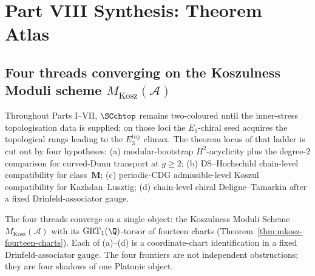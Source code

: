 
\chapter*{Part VIII Synthesis: Theorem Atlas}
\label{chap:part-viii-synthesis}

\section{Four threads converging on the Koszulness Moduli scheme
$M_{\mathrm{Kosz}}(\mathcal{A})$}
\label{sec:part-viii-overview}

Throughout Parts I--VII, $\SCchtop$ remains two-coloured until the
inner-stress topologisation data is supplied; on those loci the
$E_{1}$-chiral seed acquires the topological rungs leading to the
$E_{3}^{\mathrm{top}}$ climax. The theorem locus of that ladder is cut out by
four hypotheses:
(a) modular-bootstrap \(H^{2}\)-acyclicity plus the degree-\(2\)
comparison for curved-Dunn transport at \(g\ge2\);
(b) DS--Hochschild chain-level compatibility for class~$\mathbf{M}$;
(c) periodic-CDG admissible-level Koszul compatibility for
Kazhdan--Lusztig; (d) chain-level chiral Deligne--Tamarkin after a
fixed Drinfeld-associator gauge.

The four threads converge on a single object: the Koszulness Moduli
Scheme $M_{\mathrm{Kosz}}(\mathcal A)$ with its $\mathrm{GRT}_{1}(\Q)$-torsor
of fourteen charts (Theorem~\ref{thm:mkosz-fourteen-charts}). Each of
(a)--(d) is a coordinate-chart identification in a fixed
Drinfeld-associator gauge. The four frontiers are not independent
obstructions; they are four shadows of one Platonic object.

